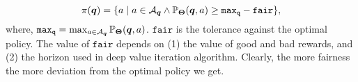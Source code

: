 \begin{equation}
\label{Eq:Policy-fair}
\pi(\bm{q}) = \{a \mid a \in {\cal A}_{\bm{q}} \wedge \mathbb{P}_{\bm{\Theta}}(\bm{q}, a) \geq \mathtt{max_{\bm{q}}} - \mathtt{fair}\},
\end{equation}
where, $\mathtt{max_{\bm{q}}} = \max_{a \in {\cal A}_{\bm{q}}}\mathbb{P}_{\bm{\Theta}}(\bm{q}, a)$.  $\mathtt{fair}$ is the tolerance against the optimal policy. The value of $\mathtt{fair}$ depends on (1) the value of good and bad rewards, and (2) the  horizon used in deep value iteration algorithm. Clearly, the more fairness the more deviation from the optimal policy we get. 